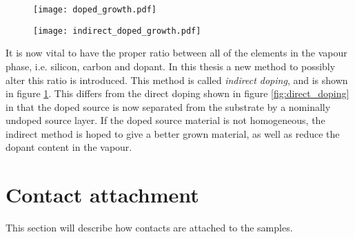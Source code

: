 \begin{figure}[h]
\centering
\begin{minipage}{.5\textwidth}
  \centering
  \texttt{[image: doped\_growth.pdf]}
  \label{fig:direct_doping}
\end{minipage}%
\begin{minipage}{.5\textwidth}
  \centering
  \texttt{[image: indirect\_doped\_growth.pdf]}
  \label{fig:indirect_doping}
\end{minipage}
\end{figure}

It is now vital to have the proper ratio between all of the elements in the vapour phase, i.e. silicon, carbon and dopant. In this thesis a new method to possibly alter this ratio is introduced. This method is called \emph{indirect doping}, and is shown in figure \ref{fig:indirect_doping}. This differs from the direct doping shown in figure \ref{fig:direct_doping} in that the doped source is now separated from the substrate by a nominally undoped source layer. If the doped source material is not homogeneous, the indirect method is hoped to give a better grown material, as well as reduce the dopant content in the vapour. 

	
\section{Contact attachment}
This section will describe how contacts are attached to the samples. 




 
 

